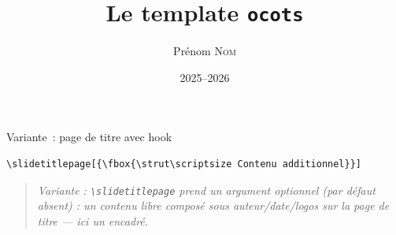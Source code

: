\documentclass[9pt,t]{beamer}
\title{Le template \texttt{ocots}}
\author{Prénom \textsc{Nom}}
\date{2025--2026}
\newcommand{\ocotsvariantnote}[1]{\begin{quote}\itshape Variante : #1\end{quote}}
\begin{document}
\begin{frame}[fragile]{Variante~: page de titre avec hook}
\begin{lstlisting}
\slidetitlepage[{\fbox{\strut\scriptsize Contenu additionnel}}]
\end{lstlisting}
\ocotsvariantnote{\texttt{\textbackslash slidetitlepage} prend un argument
optionnel (par défaut absent) : un contenu libre composé sous
auteur/date/logos sur la page de titre — ici un encadré.}
\end{frame}



\end{document}
